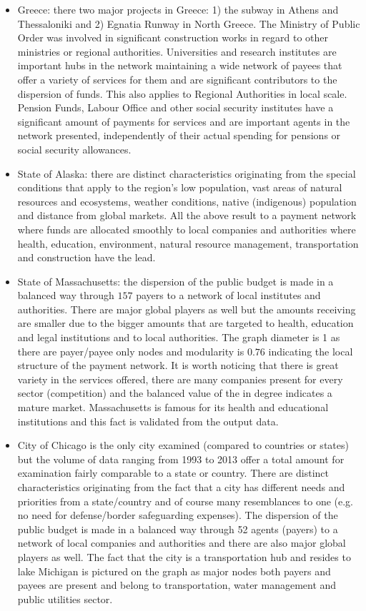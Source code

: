 \documentclass[1p,12pt]{elsarticle}
\begin{document}
\begin{itemize}
	\item Greece: there two major projects in Greece: 1) the subway in Athens and Thessaloniki and 2) Egnatia Runway in North Greece. The Ministry of Public Order was involved in significant construction works in regard to other ministries or regional authorities. Universities and research institutes are important hubs in the network maintaining a wide network of payees that offer a variety of services for them and are significant contributors to the dispersion of funds. This also applies to Regional Authorities in local scale. Pension Funds, Labour Office and other social security institutes have a significant amount of payments for services and are important agents in the network presented, independently of their actual spending for pensions or social security allowances.
	
	\item State of Alaska: there are distinct characteristics originating from the special conditions that apply to the region's low population, vast areas of natural resources and ecosystems, weather conditions, native (indigenous) population and distance from global markets. All the above result to a payment network where funds are allocated smoothly to local companies and authorities where health, education, environment, natural resource management, transportation and construction have the lead.
	
	\item State of Massachusetts: the dispersion of the public budget is made in a balanced way through $157$ payers to a network of local institutes and authorities. There are major global players as well but the amounts receiving are smaller due to the bigger amounts that are targeted to health, education and legal institutions and to local authorities. The graph diameter is 1 as there are payer/payee only nodes and modularity is $0.76$ indicating the local structure of the payment network. It is worth noticing that there is great variety in the services offered, there are many companies present for every sector (competition) and the balanced value of the in degree indicates a mature market. Massachusetts is famous for its health and educational institutions and this fact is validated from the output data.
	
	\item City of Chicago is the only city examined (compared to countries or states) but the volume of data ranging from 1993 to 2013 offer a total amount for examination fairly comparable to a state or country. There are distinct characteristics originating from the fact that a city has different needs and priorities from a state/country and of course many resemblances to one (e.g. no need for defense/border safeguarding expenses). The dispersion of the public budget is made in a balanced way through 52 agents (payers) to a network of local companies and authorities and there are also major global players as well. The fact that the city is a transportation hub and resides to lake Michigan is pictured on the graph as major nodes both payers and payees are present and belong to transportation, water management and public utilities sector. 
	
	
	\end{itemize}
\end{document}
